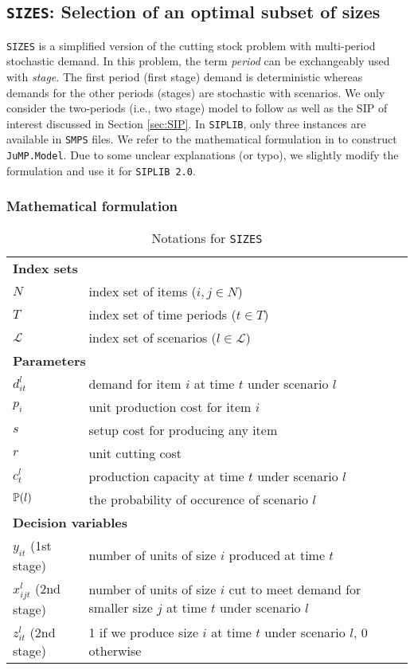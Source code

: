 \subsection{\texttt{SIZES}: Selection of an optimal subset of sizes}
\texttt{SIZES} is a simplified version of the cutting stock problem with multi-period stochastic demand. In this problem, the term \textit{period} can be exchangeably used with \textit{stage}. The first period (first stage) demand is deterministic whereas demands for the other periods (stages) are stochastic with scenarios. We only consider the two-periods (i.e., two stage) model to follow \cite{journal:JSW1999} as well as the SIP of interest discussed in Section \ref{sec:SIP}. In \texttt{SIPLIB}, only three instances are available in \texttt{SMPS} files. We refer to the mathematical formulation in \cite{journal:JSW1999} to construct \texttt{JuMP.Model}. Due to some unclear explanations (or typo), we slightly modify the formulation and use it for \texttt{SIPLIB 2.0}.

\subsubsection{Mathematical formulation}
\begin{table}[H]
	\caption{Notations for \texttt{SIZES}}
	\label{notation}
	\resizebox{\textwidth}{!}
	{
		\begin{tabular}{ll}
			\toprule
			\multicolumn{2}{l}{\textbf{Index sets}} \\
			$N$ & \textrm{index set of items ($i,j\in N$)} \\ 
			$T$ & \textrm{index set of time periods ($t\in T$)} \\ 
			$\mathcal{L}$ & \textrm{index set of scenarios ($l\in\mathcal{L}$)}\\ \midrule
			\multicolumn{2}{l}{\textbf{Parameters}} \\
			$d_{it}^l$ &	demand for item $i$ at time $t$ under scenario $l$\\
			$p_{i}$ & unit production cost for item $i$\\
			$s$	& setup cost for producing any item\\
			$r$ & unit cutting cost\\ 
			$c_{t}^l$ & production capacity at time $t$ under scenario $l$\\
			$\operatorname*{\mathbb{P}}(l)$ & the probability of occurence of scenario $l$\\ \midrule
			\multicolumn{2}{l}{\textbf{Decision variables}} \\
			$y_{it}$ (1st stage)  & number of units of size $i$ produced at time $t$ \\
			$x_{ijt}^l$ (2nd stage) & number of units of size $i$ cut to meet demand for smaller size $j$ at time $t$ under scenario $l$\\ 
			$z_{it}^l$ (2nd stage)& 1 if we produce size $i$ at time $t$ under scenario $l$, 0 otherwise\\
			\bottomrule
		\end{tabular}
	}
\end{table} 

